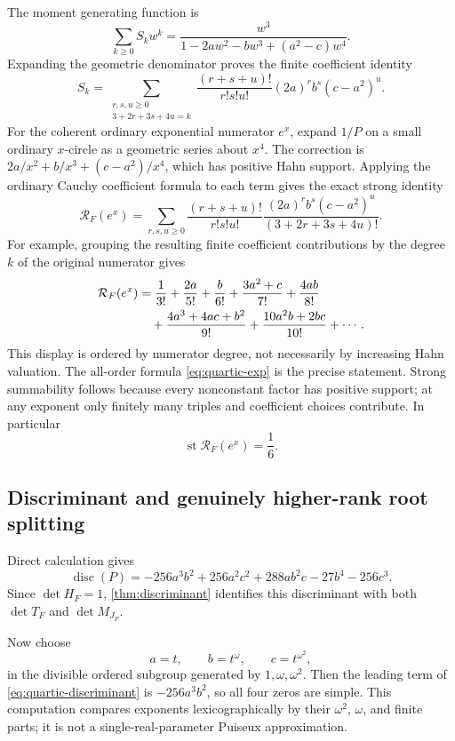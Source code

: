\documentclass[11pt,letterpaper]{article}
\theoremstyle{definition}
\theoremstyle{remark}
\newcommand{\RF}{\mathcal R_F}
\newcommand{\st}{\operatorname{st}}
\numberwithin{equation}{section}
\begin{document}
The moment generating function is
\begin{equation}\label{eq:moment-generating}
 \sum_{k\ge0}S_k w^k
 =\frac{w^3}{1-2aw^2-bw^3+(a^2-c)w^4}.
\end{equation}
Expanding the geometric denominator proves the finite coefficient identity
\begin{equation}\label{eq:moment-multinomial}
 S_k=\sum_{\substack{r,s,u\ge0\\3+2r+3s+4u=k}}
 \frac{(r+s+u)!}{r!s!u!}(2a)^r b^s(c-a^2)^u.
\end{equation}
For the coherent ordinary exponential numerator $e^x$, expand $1/P$ on a small ordinary $x$-circle as a geometric series about $x^4$. The correction is $2a/x^2+b/x^3+(c-a^2)/x^4$, which has positive Hahn support. Applying the ordinary Cauchy coefficient formula to each term gives the exact strong identity
\begin{equation}\label{eq:quartic-exp}
 \RF(e^x)=\sum_{r,s,u\ge0}
 \frac{(r+s+u)!}{r!s!u!}
 \frac{(2a)^r b^s(c-a^2)^u}{(3+2r+3s+4u)!}.
\end{equation}
For example, grouping the resulting finite coefficient contributions by the degree $k$ of the original numerator gives
\begin{align}\label{eq:quartic-exp-first}
 \RF(e^x)
 &=\frac1{3!}+\frac{2a}{5!}+\frac b{6!}
 +\frac{3a^2+c}{7!}+\frac{4ab}{8!}\notag\\
 &\quad+\frac{4a^3+4ac+b^2}{9!}
 +\frac{10a^2b+2bc}{10!}+\cdots.
\end{align}
This display is ordered by numerator degree, not necessarily by increasing Hahn valuation. The all-order formula \eqref{eq:quartic-exp} is the precise statement. Strong summability follows because every nonconstant factor has positive support; at any exponent only finitely many triples and coefficient choices contribute. In particular
\[
 \st\RF(e^x)=\frac16.
\]

\subsection{Discriminant and genuinely higher-rank root splitting}
Direct calculation gives
\begin{equation}\label{eq:quartic-discriminant}
 \operatorname{disc}(P)
 =-256a^3b^2+256a^2c^2+288ab^2c-27b^4-256c^3.
\end{equation}
Since $\det H_F=1$, \cref{thm:discriminant} identifies this discriminant with both $\det T_F$ and $\det M_{J_F}$.

Now choose
\begin{equation}\label{eq:three-scales}
 a=t,\qquad b=t^\omega,\qquad c=t^{\omega^2},
\end{equation}
in the divisible ordered subgroup generated by $1,\omega,\omega^2$. Then the leading term of \eqref{eq:quartic-discriminant} is $-256a^3b^2$, so all four zeros are simple. This computation compares exponents lexicographically by their $\omega^2$, $\omega$, and finite parts; it is not a single-real-parameter Puiseux approximation.
\end{document}
